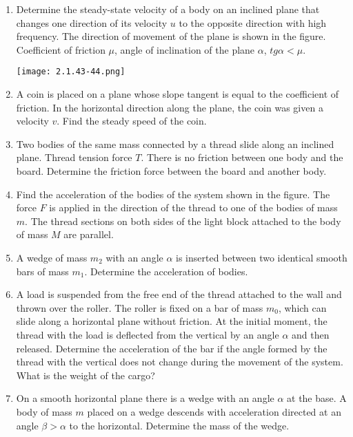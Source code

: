 \documentclass{article}
\begin{document}
\begin{enumerate}[label=2.1.\arabic*]
\item Determine the steady-state velocity of a body on an inclined plane that changes one direction of its velocity $u$ to the opposite direction with high frequency. The direction of movement of the plane is shown in the figure. Coefficient of friction $\mu$, angle of inclination of the plane $\alpha$, $tg \alpha < \mu$.

\begin{center}
    \texttt{[image: 2.1.43-44.png]}
\end{center}

\item A coin is placed on a plane whose slope tangent is equal to the coefficient of friction. In the horizontal direction along the plane, the coin was given a velocity $v$. Find the steady speed of the coin.

\item Two bodies of the same mass connected by a thread slide along an inclined plane. Thread tension force $T$. There is no friction between one body and the board. Determine the friction force between the board and another body.

\item Find the acceleration of the bodies of the system shown in the figure. The force $F$ is applied in the direction of the thread to one of the bodies of mass $m$. The thread sections on both sides of the light block attached to the body of mass $M$ are parallel.

\item A wedge of mass $m_2$ with an angle $\alpha$ is inserted between two identical smooth bars of mass $m_1$. Determine the acceleration of bodies.

\item A load is suspended from the free end of the thread attached to the wall and thrown over the roller. The roller is fixed on a bar of mass $m_0$, which can slide along a horizontal plane without friction. At the initial moment, the thread with the load is deflected from the vertical by an angle $\alpha$ and then released. Determine the acceleration of the bar if the angle formed by the thread with the vertical does not change during the movement of the system. What is the weight of the cargo?

\item On a smooth horizontal plane there is a wedge with an angle $\alpha$ at the base. A body of mass $m$ placed on a wedge descends with acceleration directed at an angle $\beta > \alpha$ to the horizontal. Determine the mass of the wedge.


\end{enumerate}
\end{document}

